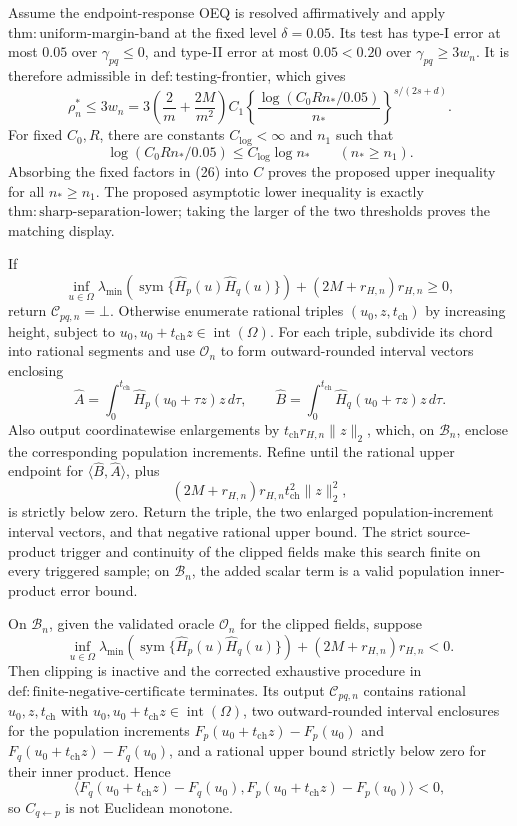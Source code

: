 Assume the endpoint-response OEQ is resolved affirmatively and apply \(\mathrm{thm:uniform\text{-}margin\text{-}band}\) at the fixed level \(\delta=0.05\).  Its test has type-I error at most \(0.05\) over \(\gamma_{pq}\le0\), and type-II error at most \(0.05<0.20\) over \(\gamma_{pq}\ge3w_n\).  It is therefore admissible in \(\mathrm{def:testing\text{-}frontier}\), which gives
\[
 \rho_n^\ast\le3w_n
 =3\left(\frac2m+\frac{2M}{m^2}\right)C_1
 \left\{\frac{\log(C_0Rn_\ast/0.05)}{n_\ast}\right\}^{s/(2s+d)}.
 \tag{26}
\]
For fixed \(C_0,R\), there are constants \(C_{\log}<\infty\) and \(n_1\) such that
\[
 \log(C_0Rn_\ast/0.05)\le C_{\log}\log n_\ast
 \qquad(n_\ast\ge n_1).
\]
Absorbing the fixed factors in (26) into \(C\) proves the proposed upper inequality for all \(n_\ast\ge n_1\).  The proposed asymptotic lower inequality is exactly \(\mathrm{thm:sharp\text{-}separation\text{-}lower}\); taking the larger of the two thresholds proves the matching display.

If
\[
 \inf_{u\in\Omega}\lambda_{\min}\!\left(\operatorname{sym}\{\widehat H_p(u)\widehat H_q(u)\}\right)
 +(2M+r_{H,n})r_{H,n}\ge0,
\]
return \(\mathcal C_{pq,n}=\bot\). Otherwise enumerate rational triples \((u_0,z,t_{\mathrm{ch}})\) by increasing height, subject to \(u_0,u_0+t_{\mathrm{ch}}z\in\operatorname{int}(\Omega)\). For each triple, subdivide its chord into rational segments and use \(\mathcal O_n\) to form outward-rounded interval vectors enclosing
\[
 \widehat A=\int_0^{t_{\mathrm{ch}}}\widehat H_p(u_0+\tau z)z\,d\tau,
 \qquad
 \widehat B=\int_0^{t_{\mathrm{ch}}}\widehat H_q(u_0+\tau z)z\,d\tau.
\]
Also output coordinatewise enlargements by \(t_{\mathrm{ch}}r_{H,n}\lVert z\rVert_2\), which, on \(\mathcal B_n\), enclose the corresponding population increments. Refine until the rational upper endpoint for \(\langle\widehat B,\widehat A\rangle\), plus
\[
 (2M+r_{H,n})r_{H,n}t_{\mathrm{ch}}^2\lVert z\rVert_2^2,
\]
is strictly below zero. Return the triple, the two enlarged population-increment interval vectors, and that negative rational upper bound. The strict source-product trigger and continuity of the clipped fields make this search finite on every triggered sample; on \(\mathcal B_n\), the added scalar term is a valid population inner-product error bound.

On \(\mathcal B_n\), given the validated oracle \(\mathcal O_n\) for the clipped fields, suppose
\[
 \inf_{u\in\Omega}\lambda_{\min}\!\left(\operatorname{sym}\{\widehat H_p(u)\widehat H_q(u)\}\right)
 +(2M+r_{H,n})r_{H,n}<0.
\]
Then clipping is inactive and the corrected exhaustive procedure in \(\mathrm{def:finite\text{-}negative\text{-}certificate}\) terminates. Its output \(\mathcal C_{pq,n}\) contains rational \(u_0,z,t_{\mathrm{ch}}\) with \(u_0,u_0+t_{\mathrm{ch}}z\in\operatorname{int}(\Omega)\), two outward-rounded interval enclosures for the population increments \(F_p(u_0+t_{\mathrm{ch}}z)-F_p(u_0)\) and \(F_q(u_0+t_{\mathrm{ch}}z)-F_q(u_0)\), and a rational upper bound strictly below zero for their inner product. Hence
\[
 \langle F_q(u_0+t_{\mathrm{ch}}z)-F_q(u_0),F_p(u_0+t_{\mathrm{ch}}z)-F_p(u_0)\rangle<0,
\]
so \(C_{q\leftarrow p}\) is not Euclidean monotone.

